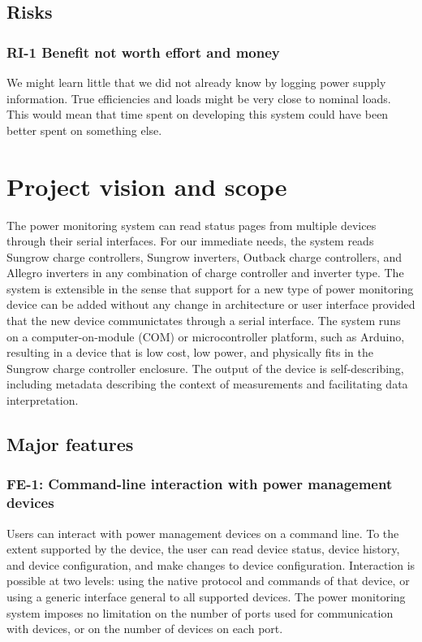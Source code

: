 \documentclass[pdftex,oneside,12pt,a4paper]{book}
\begin{document}
\section{Risks}
\subsection{RI-1 Benefit not worth effort and money}
We might learn little that we did not already know by logging power supply information.  True efficiencies and loads might be very close to nominal loads.  This would mean that time spent on developing this system could have been better spent on something else.

\chapter{Project vision and scope}
The power monitoring system can read status pages from multiple devices through their serial interfaces. For our immediate needs, the system reads Sungrow charge controllers, Sungrow inverters, Outback charge controllers, and Allegro inverters in any combination of charge controller and inverter type.  The system is extensible in the sense that support for a new type of power monitoring device can be added without any change in architecture or user interface provided that the new device communictates through a serial interface.  The system runs on a computer-on-module (COM) or microcontroller platform, such as Arduino, resulting in a device that is low cost, low power, and physically fits in the Sungrow charge controller enclosure.  The output of the device is self-describing, including metadata describing the context of measurements and facilitating data interpretation.

\section{Major features}
\subsection{FE-1: Command-line interaction with power management devices}
Users can interact with power management devices on a command line.  To the extent supported by the device, the user can read device status, device history, and device configuration, and make changes to device configuration.  Interaction is possible at two levels:  using the native protocol and commands of that device, or using a generic interface general to all supported devices.  The power monitoring system imposes no limitation on the number of ports used for communication with devices, or on the number of devices on each port.
\end{document}

